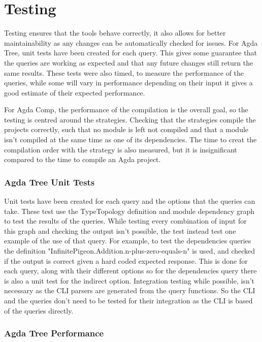 
\chapter{Testing}

Testing ensures that the tools behave correctly, it also allows for better
maintainability as any changes can be automatically checked for issues. For
Agda Tree, unit tests have been created for each query. This gives some
guarantee that the queries are working as expected and that any future changes
still return the same results. These tests were also timed, to measure the
performance of the queries, while some will vary in performance depending on
their input it gives a good estimate of their expected performance.

For Agda Comp, the performance of the compilation is the overall goal, so the
testing is centred around the strategies. Checking that the strategies compile
the projects correctly, such that no module is left not compiled and that a
module isn't compiled at the same time as one of its dependencies. The time to
creat the compilation order with the strategy is also measured, but it is
insignificant compared to the time to compile an Agda project.

\subsection{Agda Tree Unit Tests}

Unit tests have been created for each query and the options that the queries
can take. These test use the TypeTopology definition and module dependency
graph to test the results of the queries. While testing every combination of
input for this graph and checking the output isn't possible, the test instead
test one example of the use of that query. For example, to test the
dependencies queries the definition
"InfinitePigeon.Addition.n-plus-zero-equals-n" is used, and checked if the
output is correct given a hard coded expected response. This is done for each
query, along with their different options so for the dependencies query there
is also a unit test for the indirect option. Integration testing while
possible, isn't necessary as the CLI parsers are generated from the query
functions. So the CLI and the queries don't need to be tested for their
integration as the CLI is based of the queries directly. 

\subsection{Agda Tree Performance} \label{sub:agda tree performance}

